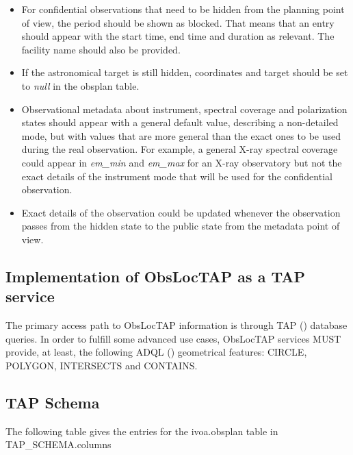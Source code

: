 \documentclass[11pt,a4paper]{ivoa}
\begin{document}
\begin{itemize}
	\item{For confidential observations that need to be hidden from the planning
  point of view, the period should be shown as blocked. That means that an entry
  should appear with the start time, end time and duration as relevant. The
  facility name should also be provided.}

	\item{If the astronomical target is still hidden, coordinates and target
  should be set to \textit{null} in the obsplan table.}

	\item{Observational metadata about instrument, spectral coverage and
  polarization states should appear with a general default value, describing a
  non-detailed mode, but with values that are more general than the exact ones
  to be used during the real observation. For example, a general X-ray spectral
  coverage could appear in \textit{em\_min} and \textit{em\_max} for an X-ray
  observatory but not the exact details of the instrument mode that will be used
  for the confidential observation.}

	\item{Exact details of the observation could be updated whenever the
  observation passes from the hidden state to the public state from the
  metadata point of view.}

\end{itemize}

\subsection{Implementation of ObsLocTAP as a TAP service}
The primary access path to ObsLocTAP information is through TAP
(\citealt{2010ivoa.spec.0327D}) database queries. In order to fulfill some advanced
use cases, ObsLocTAP services MUST provide, at least, the following ADQL
(\citealt{2008ivoa.spec.1030O}) geometrical features: CIRCLE, POLYGON, INTERSECTS
and CONTAINS.\par

\subsection{TAP Schema}
The following table gives the entries for the ivoa.obsplan table in
TAP\_SCHEMA.columns
\end{document}
